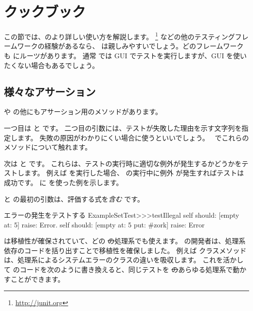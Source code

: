 \documentclass[a4paper,10pt,twoside]{book}
\begin{document}

\section{\SUnit クックブック}
この節では、\SUnit のより詳しい使い方を解説します。
\JUnit\footnote{\url{http://junit.org}} などの他のテスティングフレームワークの経験があるなら、
\SUnit は親しみやすいでしょう。どのフレームワークも \SUnit にルーツがあります。
通常 \SUnit では GUI でテストを実行しますが、GUI を使いたくない場合もあるでしょう。
\subsection{様々なアサーション}
 や  の他にもアサーション用のメソッドがあります。

一つ目は  と  です。
二つ目の引数には、テストが失敗した理由を示す文字列を指定します。
失敗の原因がわかりにくい場合に使うといいでしょう。
~でこれらのメソッドについて触れます。

次は  と  です。
これらは、テストの実行時に適切な例外が発生するかどうかをテストします。
例えば  を実行した場合、 の実行中に例外  が発生すればテストは成功です。
 に \mbox{} を使った例を示します。

 と  の最初の引数は、評価する式を\emph{含む} です。

\begin{method}[ESTtestIllegal]{エラーの発生をテストする}
ExampleSetTest>>>testIllegal
	self should: [empty at: 5] raise: Error.
	self should: [empty at: 5 put: #zork] raise: Error
\end{method}

\sunit は移植性が確保されていて、どの \st の処理系でも使えます。
\sunit の開発者は、処理系依存のコードを括り出すことで移植性を確保しました。
例えば  クラスメソッドは、処理系によるシステムエラーのクラスの違いを吸収します。
これを活かして  のコードを次のように書き換えると、同じテストを \st のあらゆる処理系で動かすことができます。
\end{document}
